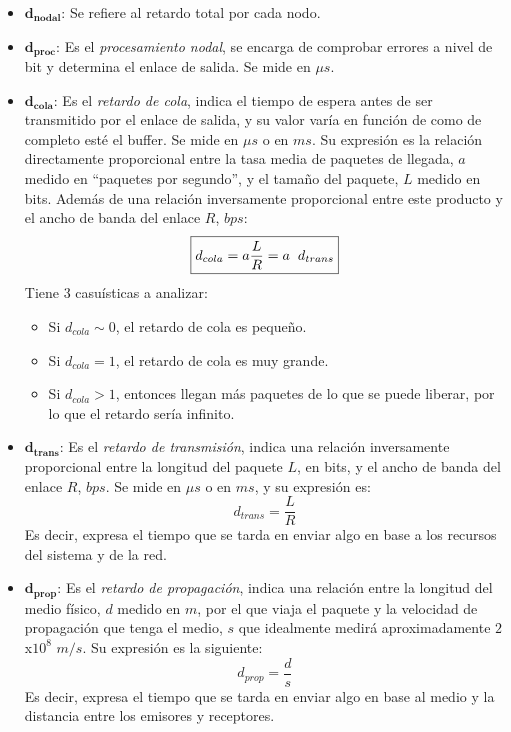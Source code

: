 \begin{itemize}
        \item \(\mathbf{d_{nodal}}\): Se refiere al retardo total por cada nodo.
        \item \(\mathbf{d_{proc}}\): Es el \textit{procesamiento nodal}, se encarga de comprobar errores a nivel de bit y determina el enlace de salida. Se mide en \(\mu s\).
        \item \(\mathbf{d_{cola}}\): Es el \textit{retardo de cola}, indica el tiempo de espera antes de ser transmitido por el enlace de salida, y su valor varía en función de como de completo esté el buffer. Se mide en \(\mu s\) o en \(ms\). Su expresión es la relación directamente proporcional entre la tasa media de paquetes de llegada, \(a\) medido en ``paquetes por segundo'', y el tamaño del paquete, \(L\) medido en bits. Además de una relación inversamente proporcional entre este producto y el ancho  de banda del enlace \(R\), \(bps\):
              \[
                      \boxed{d_{cola} = a \frac{L}{R} = a \hspace{2mm}d_{trans}}
              \]
              Tiene 3 casuísticas a analizar:
              \begin{itemize}
                      \item Si \(d_{cola} \sim 0 \), el retardo de cola es pequeño.
                      \item Si \(d_{cola} = 1 \), el retardo de cola es muy grande.
                      \item Si \(d_{cola} > 1 \), entonces llegan más paquetes de lo que se puede liberar, por lo que el retardo sería infinito.
              \end{itemize}
        \item \(\mathbf{d_{trans}}\): Es el \textit{retardo de transmisión}, indica una relación inversamente proporcional entre la longitud del paquete \(L\), en bits, y el ancho  de banda del enlace \(R\), \(bps\). Se mide en \(\mu s\) o en \(ms\), y su expresión es:
              \[
                      \boxed{d_{trans} = \frac{L}{R}}
              \]
              \noindent Es decir, expresa el tiempo que se tarda en enviar algo en base a los recursos del sistema y de la red.
        \item \(\mathbf{d_{prop}}\): Es el \textit{retardo de propagación}, indica una relación entre la longitud del medio físico, \(d\) medido en \(m\), por el que viaja el paquete y la velocidad de propagación que tenga el medio, \(s\) que idealmente medirá aproximadamente \(2\)x\(10^8\) \(m/s\). Su expresión es la siguiente:
              \[
                      \boxed{d_{prop} = \frac{d}{s}}
              \]
              \noindent Es decir, expresa el tiempo que se tarda en enviar algo en base al medio y la distancia entre los emisores y receptores.
\end{itemize}
